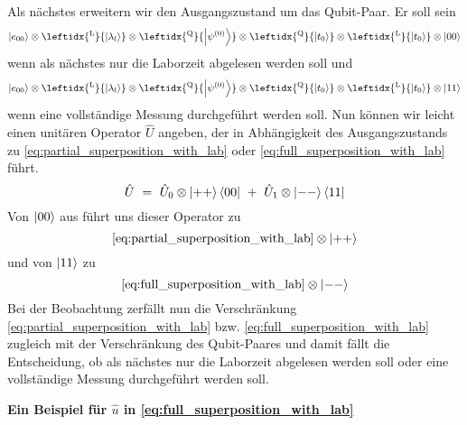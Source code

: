 \documentclass[12pt]{article}
\begin{document}
Als nächstes erweitern wir den Ausgangszustand um das Qubit-Paar. Er soll sein 
\begin{equation*}
\ket{e_{00}} 
\otimes \leftidx{^\mathrm{L}}{\ket{\lambda_l}} 
\otimes \leftidx{^\mathrm{Q}}{\ket{\psi^{(0)}}}
\otimes \leftidx{^\mathrm{Q}}{\ket{t_0}}
\otimes \leftidx{^\mathrm{L}}{\ket{t_0}}
\otimes \ket{00}
\end{equation*}
wenn als nächstes nur die Laborzeit abgelesen werden soll und 
\begin{equation*}
\ket{e_{00}} 
\otimes \leftidx{^\mathrm{L}}{\ket{\lambda_l}} 
\otimes \leftidx{^\mathrm{Q}}{\ket{\psi^{(0)}}}
\otimes \leftidx{^\mathrm{Q}}{\ket{t_0}}
\otimes \leftidx{^\mathrm{L}}{\ket{t_0}}
\otimes \ket{11}
\end{equation*}
wenn eine vollständige Messung durchgeführt werden soll. Nun können wir leicht einen unitären Operator $\hat{U}$ angeben, der in Abhängigkeit des Ausgangszustands zu \eqref{eq:partial_superposition_with_lab} oder \eqref{eq:full_superposition_with_lab} führt.
\begin{equation*}
\hat{U}\ =\ \hat{U}_0 \otimes \ket{++}\bra{00}\ +\ \hat{U}_1 \otimes \ket{--}\bra{11}
\end{equation*}
Von $\ket{00}$ aus führt uns dieser Operator zu 
\begin{equation*}
\eqref{eq:partial_superposition_with_lab} \otimes \ket{++}
\end{equation*}
und von $\ket{11}$ zu 
\begin{equation*}
\eqref{eq:full_superposition_with_lab} \otimes \ket{--}
\end{equation*}
Bei der Beobachtung zerfällt nun die Verschränkung \eqref{eq:partial_superposition_with_lab} bzw. \eqref{eq:full_superposition_with_lab} zugleich mit der Verschränkung des Qubit-Paares und damit fällt die Entscheidung, ob als nächstes nur die Laborzeit abgelesen werden soll oder eine vollständige Messung durchgeführt werden soll. 

\textbf{Ein Beispiel für $\hat{u}$ in \eqref{eq:full_superposition_with_lab}}
\end{document}
